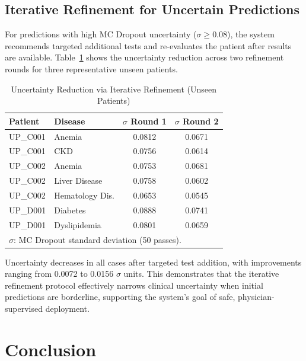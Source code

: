 \documentclass[conference]{IEEEtran}
\begin{document}
\subsection{Iterative Refinement for Uncertain Predictions}
\label{subsec:iterative}

For predictions with high MC Dropout uncertainty ($\sigma \geq 0.08$), the system
recommends targeted additional tests and re-evaluates the patient after results
are available.
Table~\ref{tab:refinement} shows the uncertainty reduction across two refinement
rounds for three representative unseen patients.

\begin{table}[h]
  \caption{Uncertainty Reduction via Iterative Refinement (Unseen Patients)}
  \label{tab:refinement}
  \centering
  \small
  \begin{tabular}{llcc}
    \toprule
    \textbf{Patient} & \textbf{Disease} &
    \textbf{$\sigma$ Round 1} & \textbf{$\sigma$ Round 2} \\
    \midrule
    UP\_C001 & Anemia         & 0.0812 & 0.0671 \\
    UP\_C001 & CKD            & 0.0756 & 0.0614 \\
    UP\_C002 & Anemia         & 0.0753 & 0.0681 \\
    UP\_C002 & Liver Disease  & 0.0758 & 0.0602 \\
    UP\_C002 & Hematology Dis.& 0.0653 & 0.0545 \\
    UP\_D001 & Diabetes       & 0.0888 & 0.0741 \\
    UP\_D001 & Dyslipidemia   & 0.0801 & 0.0659 \\
    \bottomrule
    \multicolumn{4}{l}{\small $\sigma$: MC Dropout standard deviation (50 passes).} \\
  \end{tabular}
\end{table}

Uncertainty decreases in all cases after targeted test addition, with
improvements ranging from 0.0072 to 0.0156 $\sigma$ units.
This demonstrates that the iterative refinement protocol effectively
narrows clinical uncertainty when initial predictions are borderline,
supporting the system's goal of safe, physician-supervised deployment.

\section{Conclusion}
\label{sec:conclusion}
\end{document}
